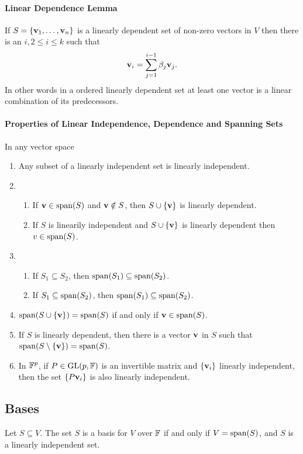 \paragraph{Linear Dependence Lemma}
If \(S = \{\mathbf{v}_1, \dots, \mathbf{v}_n\}\) is a linearly dependent set of non-zero vectors in \(V\) then there is an \(i, 2 \leq i \leq k\) such that 
\[\mathbf{v}_i = \sum_{j=1}^{i-1} \beta_j\mathbf{v}_j.\]
In other words in a ordered linearly dependent set at least one vector is a linear combination of its predecessors.

\paragraph{Properties of Linear Independence, Dependence and Spanning Sets}
In any vector space
\begin{enumerate}
    \item Any subset of a linearly independent set is linearly independent.
    \item \begin{enumerate}
        \item If \(\mathbf{v} \in \mathrm{span}(S)\) and \(\mathbf{v} \notin S\), then \(S \cup \{\mathbf{v}\}\) is linearly dependent.
        \item If \(S\) is linearily independent and \(S \cup \{\mathbf{v}\}\) is linearly dependent then \(v \in \mathrm{span}(S)\).
    \end{enumerate}
    \item \begin{enumerate}
        \item If \(S_1 \subseteq S_2\), then \(\mathrm{span}(S_1) \subseteq \mathrm{span}(S_2)\).
        \item If \(S_1 \subseteq \mathrm{span}(S_2)\), then \(\mathrm{span}(S_1) \subseteq \mathrm{span}(S_2)\).
    \end{enumerate}
    \item \(\mathrm{span}(S \cup \{\mathbf{v}\}) = \mathrm{span}(S)\) if and only if \(\mathbf{v} \in \mathrm{span}(S)\).
    \item If \(S\) is linearly dependent, then there is a vector \(\mathbf{v}\) in \(S\) such that \(\mathrm{span}(S \setminus \{\mathbf{v}\}) = \mathrm{span}(S)\).
    \item In \(\mathbb{F}^p\), if \(P \in \operatorname{GL}(p, \mathbb{F})\) is an invertible matrix and \(\{\mathbf{v}_i\}\) linearly independent, then the set \(\{P\mathbf{v}_i\}\) is also linearly independent. 
\end{enumerate}

\subsection{Bases}
Let \(S \subseteq V\). The set \(S\) is a basis for \(V\) over \(\mathbb{F}\) if and only if \(V = \mathrm{span}(S)\), and \(S\) is a linearly independent set.

